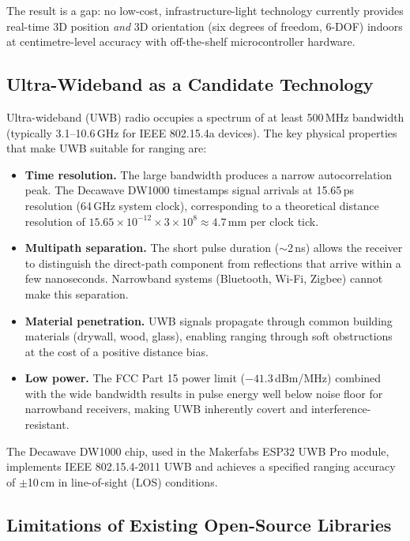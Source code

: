 \documentclass[11pt,a4paper]{article}
\begin{document}
The result is a gap: no low-cost, infrastructure-light technology currently provides real-time 3D position \emph{and} 3D orientation (six degrees of freedom, 6-DOF) indoors at centimetre-level accuracy with off-the-shelf microcontroller hardware.

\subsection{Ultra-Wideband as a Candidate Technology}

Ultra-wideband (UWB) radio occupies a spectrum of at least 500\,MHz bandwidth (typically 3.1--10.6\,GHz for IEEE 802.15.4a devices). The key physical properties that make UWB suitable for ranging are:

\begin{itemize}[leftmargin=2em]
  \item \textbf{Time resolution.} The large bandwidth produces a narrow autocorrelation peak. The Decawave DW1000 timestamps signal arrivals at 15.65\,ps resolution (64\,GHz system clock), corresponding to a theoretical distance resolution of $15.65 \times 10^{-12} \times 3 \times 10^8 \approx 4.7$\,mm per clock tick.
  \item \textbf{Multipath separation.} The short pulse duration ($\sim$2\,ns) allows the receiver to distinguish the direct-path component from reflections that arrive within a few nanoseconds. Narrowband systems (Bluetooth, Wi-Fi, Zigbee) cannot make this separation.
  \item \textbf{Material penetration.} UWB signals propagate through common building materials (drywall, wood, glass), enabling ranging through soft obstructions at the cost of a positive distance bias.
  \item \textbf{Low power.} The FCC Part 15 power limit ($-41.3$\,dBm/MHz) combined with the wide bandwidth results in pulse energy well below noise floor for narrowband receivers, making UWB inherently covert and interference-resistant.
\end{itemize}

The Decawave DW1000 chip, used in the Makerfabs ESP32 UWB Pro module, implements IEEE 802.15.4-2011 UWB and achieves a specified ranging accuracy of $\pm$10\,cm in line-of-sight (LOS) conditions.

\subsection{Limitations of Existing Open-Source Libraries}
\end{document}
